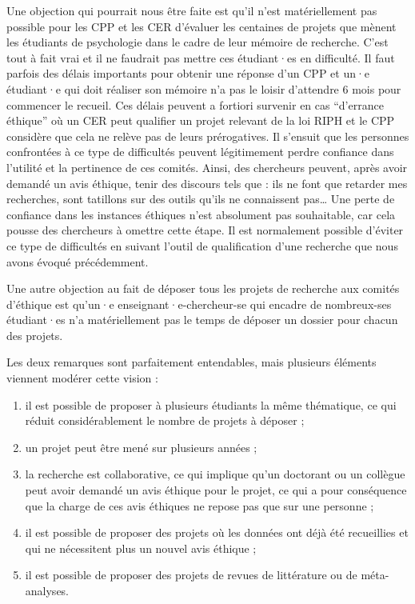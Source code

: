 \documentclass[
  12pt,
]{book}
\begin{document}
Une objection qui pourrait nous être faite est qu'il n'est matériellement pas possible pour les CPP et les CER d'évaluer les centaines de projets que mènent les étudiants de psychologie dans le cadre de leur mémoire de recherche. C'est tout à fait vrai et il ne faudrait pas mettre ces étudiant·es en difficulté. Il faut parfois des délais importants pour obtenir une réponse d'un CPP et un·e étudiant·e qui doit réaliser son mémoire n'a pas le loisir d'attendre 6 mois pour commencer le recueil. Ces délais peuvent a fortiori survenir en cas ``d'errance éthique'' où un CER peut qualifier un projet relevant de la loi RIPH et le CPP considère que cela ne relève pas de leurs prérogatives. Il s'ensuit que les personnes confrontées à ce type de difficultés peuvent légitimement perdre confiance dans l'utilité et la pertinence de ces comités. Ainsi, des chercheurs peuvent, après avoir demandé un avis éthique, tenir des discours tels que : ils ne font que retarder mes recherches, sont tatillons sur des outils qu'ils ne connaissent pas\ldots{} Une perte de confiance dans les instances éthiques n'est absolument pas souhaitable, car cela pousse des chercheurs à omettre cette étape. Il est normalement possible d'éviter ce type de difficultés en suivant l'outil de qualification d'une recherche que nous avons évoqué précédemment.

Une autre objection au fait de déposer tous les projets de recherche aux comités d'éthique est qu'un·e enseignant·e-chercheur-se qui encadre de nombreux-ses étudiant·es n'a matériellement pas le temps de déposer un dossier pour chacun des projets.

Les deux remarques sont parfaitement entendables, mais plusieurs éléments viennent modérer cette vision :

\begin{enumerate}
\def\labelenumi{\arabic{enumi})}
\item
  il est possible de proposer à plusieurs étudiants la même thématique, ce qui réduit considérablement le nombre de projets à déposer ;
\item
  un projet peut être mené sur plusieurs années ;
\item
  la recherche est collaborative, ce qui implique qu'un doctorant ou un collègue peut avoir demandé un avis éthique pour le projet, ce qui a pour conséquence que la charge de ces avis éthiques ne repose pas que sur une personne ;
\item
  il est possible de proposer des projets où les données ont déjà été recueillies et qui ne nécessitent plus un nouvel avis éthique ;
\item
  il est possible de proposer des projets de revues de littérature ou de méta-analyses.
\end{enumerate}
\end{document}
